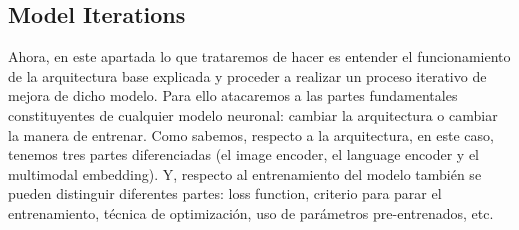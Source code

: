 \subsection{Model Iterations}\label{sec:model-iterations}

\begin{comment}

TODO. Model iterations. Lo tengo en Notas.org, mirar a ver si se puede exportar
a LaTeX.

\url{https://www.reddit.com/r/emacs/comments/lzsx1q/perfect_emacs_org_mode_exports_to_latex_easy_and/}

TODO. Mirar para hacer las gráficas. Mejor generar CSV con Python y plotear en
LaTeX.

\url{https://tex.stackexchange.com/questions/83888/how-to-plot-data-from-a-csv-file-using-tikz-and-csvsimple}.

\url{https://www.latex4technics.com/?note=lj0uix}



  1. He estado trabajando con el modelo de RefVOS, pero no he conseguido
  obtener ninguna mejora significativa. Hasta ahora lo que he probado ha sido:

  - Cambiar la manera en la que se unen las neuronas que provienen de la imagen
  y las que provienen del texto (en el modelo se usa multiplicación). He
  probado a entrenar con suma, resta, concatenación y proyectando usando una
  aplicación lineal (multiplicándolas por una matriz y luego combinándolas).

  - Probar diferentes funciones de error: "weighted cross entropy", "balanced
  cross entropy", "focal loss". Quiero probar también con otras como: "dice
  loss", "tversky index", "IoU loss"...  Las variaciones que he probado
  partiendo de parámetros pre-entrenados apenas varían el modelo (<1\mejora),
  posiblemente porque ya esté el modelo en cierto mínimo local de la función de
  error (al final son todas similares) y los gradientes son prácticamente
  nulos.

  Y probando variaciones con parámetros no-entrenados no consigo llegar a la
  precisión de RefVOS (entreno con train/validation/test y guardo los
  parámetros de la época con mejores resultados en validación).

  Por otro lado, he tratado de crear algún modelo desde 0, sin basarme en
  RefVOS, pero he obtenido resultados nefastos (cercanos a la aleatoriedad).
\end{comment}


Ahora, en este apartada lo que trataremos de hacer es entender el
funcionamiento de la arquitectura base explicada y proceder a realizar un
proceso iterativo de mejora de dicho modelo. Para ello atacaremos a las partes
fundamentales constituyentes de cualquier modelo neuronal: cambiar la
arquitectura o cambiar la manera de entrenar. Como sabemos, respecto a la
arquitectura, en este caso, tenemos tres partes diferenciadas (el image
encoder, el language encoder y el multimodal embedding). Y, respecto al
entrenamiento del modelo también se pueden distinguir diferentes partes: loss
function, criterio para parar el entrenamiento, técnica de optimización, uso de
parámetros pre-entrenados, etc.

